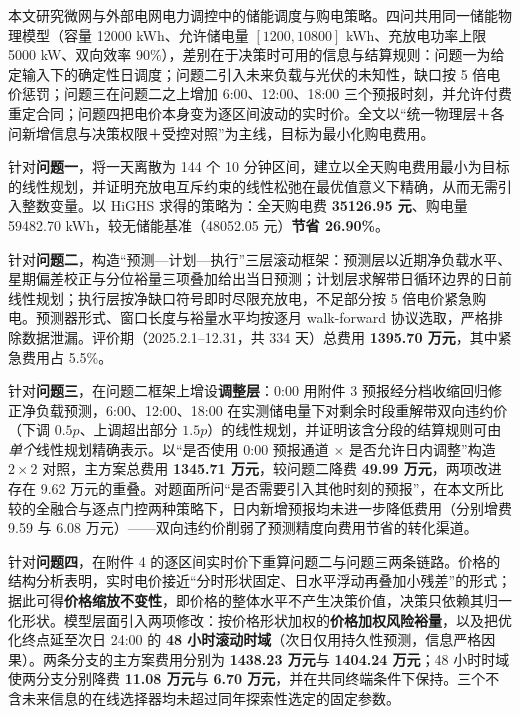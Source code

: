 
\begin{mcmabstract}
  本文研究微网与外部电网电力调控中的储能调度与购电策略。四问共用同一储能物理模型（容量 12000 kWh、允许储电量 $[1200,10800]$ kWh、充放电功率上限 5000 kW、双向效率 90\%），差别在于决策时可用的信息与结算规则：问题一为给定输入下的确定性日调度；问题二引入未来负载与光伏的未知性，缺口按 5 倍电价惩罚；问题三在问题二之上增加 6:00、12:00、18:00 三个预报时刻，并允许付费重定合同；问题四把电价本身变为逐区间波动的实时价。全文以``统一物理层＋各问新增信息与决策权限＋受控对照''为主线，目标为最小化购电费用。

  针对\textbf{问题一}，将一天离散为 144 个 10 分钟区间，建立以全天购电费用最小为目标的线性规划，并证明充放电互斥约束的线性松弛在最优值意义下精确，从而无需引入整数变量。以 HiGHS 求得的策略为：全天购电费 \textbf{35126.95 元}、购电量 59482.70 kWh，较无储能基准（48052.05 元）\textbf{节省 26.90\%}。

  针对\textbf{问题二}，构造``预测—计划—执行''三层滚动框架：预测层以近期净负载水平、星期偏差校正与分位裕量三项叠加给出当日预测；计划层求解带日循环边界的日前线性规划；执行层按净缺口符号即时尽限充放电，不足部分按 5 倍电价紧急购电。预测器形式、窗口长度与裕量水平均按逐月 walk-forward 协议选取，严格排除数据泄漏。评价期（2025.2.1--12.31，共 334 天）总费用 \textbf{1395.70 万元}，其中紧急费用占 5.5\%。

  针对\textbf{问题三}，在问题二框架上增设\textbf{调整层}：0:00 用附件 3 预报经分档收缩回归修正净负载预测，6:00、12:00、18:00 在实测储电量下对剩余时段重解带双向违约价（下调 $0.5p$、上调超出部分 $1.5p$）的线性规划，并证明该含分段的结算规则可由\emph{单个}线性规划精确表示。以``是否使用 0:00 预报通道 $\times$ 是否允许日内调整''构造 $2\times2$ 对照，主方案总费用 \textbf{1345.71 万元}，较问题二降费 \textbf{49.99 万元}，两项改进存在 9.62 万元的重叠。对题面所问``是否需要引入其他时刻的预报''，在本文所比较的全融合与逐点门控两种策略下，日内新增预报均未进一步降低费用（分别增费 9.59 与 6.08 万元）——双向违约价削弱了预测精度向费用节省的转化渠道。

  针对\textbf{问题四}，在附件 4 的逐区间实时价下重算问题二与问题三两条链路。价格的结构分析表明，实时电价接近``分时形状固定、日水平浮动再叠加小残差''的形式；据此可得\textbf{价格缩放不变性}，即价格的整体水平不产生决策价值，决策只依赖其归一化形状。模型层面引入两项修改：按价格形状加权的\textbf{价格加权风险裕量}，以及把优化终点延至次日 24:00 的 \textbf{48 小时滚动时域}（次日仅用持久性预测，信息严格因果）。两条分支的主方案费用分别为 \textbf{1438.23 万元}与 \textbf{1404.24 万元}；48 小时时域使两分支分别降费 \textbf{11.08 万元}与 \textbf{6.70 万元}，并在共同终端条件下保持。三个不含未来信息的在线选择器均未超过同年探索性选定的固定参数。
\end{mcmabstract}

\clearpage
